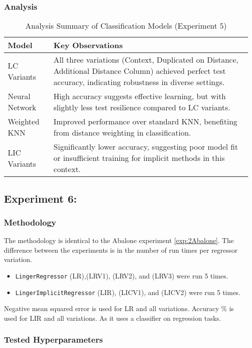 \documentclass[a4paper, 12pt]{report}
\begin{document}
\subsubsection{Analysis}
\begin{table}[H]
    \centering
    \caption{Analysis Summary of Classification Models (Experiment 5)}
    \label{tab:analysis_summary_exp5}
    \begin{tabular}{|l|l|}
    \hline
    \textbf{Model} & \textbf{Key Observations} \\
    \hline
    LC Variants & All three variations (Context, Duplicated on Distance, Additional Distance Column) achieved perfect test accuracy, indicating robustness in diverse settings. \\
    \hline
    Neural Network & High accuracy suggests effective learning, but with slightly less test resilience compared to LC variants. \\
    \hline
    Weighted KNN & Improved performance over standard KNN, benefiting from distance weighting in classification. \\
    \hline
    LIC Variants & Significantly lower accuracy, suggesting poor model fit or insufficient training for implicit methods in this context. \\
    \hline
    \end{tabular}
\end{table}

\subsection{Experiment 6:}
\subsubsection{Methodology}
The methodology is identical to the Abalone experiment \ref{exp:2Abalone}. 
The difference between  the experiments is in the number of run times per regressor variation.
\begin{itemize}
    \item \texttt{LingerRegressor} (LR),(LRV1), (LRV2), and (LRV3) were run 5 times.
    \item \texttt{LingerImplicitRegressor} (LIR), (LICV1), and (LICV2) were run 5 times.
\end{itemize}

Negative mean squared error is used for LR and all variations.
Accuracy $\%$ is used for LIR and all variations. As it uses a classifier on regression tasks.
\subsubsection{Tested Hyperparameters}
\end{document}
